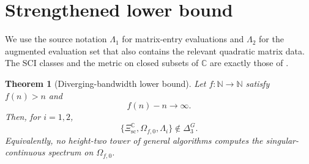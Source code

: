 \documentclass[11pt]{article}
\newtheorem{theorem}{Theorem}
\theoremstyle{remark}
\newcommand{\N}{\mathbb N}
\newcommand{\C}{\mathbb C}
\begin{document}
\section{Strengthened lower bound}

We use the source notation $\Lambda_1$ for matrix-entry evaluations and
$\Lambda_2$ for the augmented evaluation set that also contains the relevant
quadratic matrix data.  The SCI classes and the metric on closed subsets of
$\C$ are exactly those of \cite{Colbrook}.

\begin{theorem}[Diverging-bandwidth lower bound]\label{thm:main}
Let $f:\N\to\N$ satisfy $f(n)>n$ and
\[
 f(n)-n\longrightarrow\infty.
\]
Then, for $i=1,2$,
\[
 \{\Xi_{\mathrm{sc}}^{\C},\Omega_{f,0},\Lambda_i\}
 \notin\Delta_3^G.
\]
Equivalently, no height-two tower of general algorithms computes the
singular-continuous spectrum on $\Omega_{f,0}$.
\end{theorem}
\end{document}
